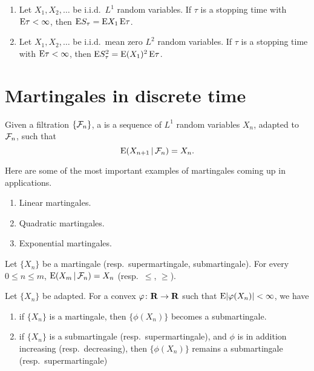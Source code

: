 \begin{namedthm} \leavevmode
    \begin{enumerate}
        \item Let $X_1,X_2,\dotsc$ be i.i.d.\ $L^1$ random variables. If $\tau$ is a stopping time with $\mathop{}\!\mathrm{E} \tau<\infty$, then $\mathop{}\!\mathrm{E} S_\tau = \mathop{}\!\mathrm{E} X_1 \mathop{}\!\mathrm{E} \tau$.
        \item Let $X_1,X_2,\dotsc$ be i.i.d.\ mean zero $L^2$ random variables.  If $\tau$ is a stopping time with $\mathop{}\!\mathrm{E} \tau<\infty$, then $\mathop{}\!\mathrm{E} S_\tau^2 = \mathop{}\!\mathrm{E}(X_1)^2\mathop{}\!\mathrm{E} \tau$.
    \end{enumerate}
\end{namedthm}

\section{Martingales in discrete time}
Given a filtration $\{\mathcal{F}_n\}$, a  is a sequence of $L^1$ random variables $X_n$, adapted to $\mathcal{F}_n$, such that \[
    \mathop{}\!\mathrm{E}(X_{n+1}\,|\, \mathcal{F}_n) = X_n.
\]

\begin{exa} Here are some of the most important examples of martingales coming up in applications.
    \begin{enumerate}
        \item Linear martingales.
        \item Quadratic martingales.
        \item Exponential martingales.
    \end{enumerate}
\end{exa}

\begin{xca}
    Let $\{X_n\}$ be a martingale (resp.\ supermartingale, submartingale). For every $0 \leq n \leq m$, $\mathop{}\!\mathrm{E}(X_m \,|\, \mathcal{F}_n) = X_n$ (resp.\ $\leq$, $\geq$).
\end{xca}

\begin{prop}
    Let $\{X_n\}$ be adapted. For a convex $\varphi\colon \mathbf{R} \to \mathbf{R}$ such that $\mathop{}\!\mathrm{E} \lvert \varphi(X_n) \rvert < \infty$, we have \begin{enumerate}
        \item if $\{X_n\}$ is a martingale, then $\{\phi(X_n)\}$ becomes a submartingale.
        \item if $\{X_n\}$ is a submartingale (resp.\ supermartingale), and $\phi$ is in addition increasing (resp.\ decreasing), then $\{\phi(X_n)\}$ remains a submartingale (resp.\ supermartingale)
    \end{enumerate}
\end{prop}


